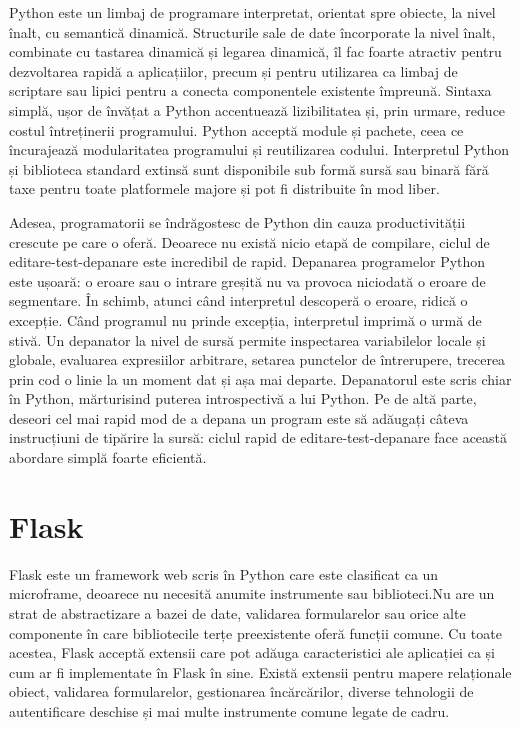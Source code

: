 \par Python este un limbaj de programare interpretat, orientat spre obiecte, la nivel înalt, cu semantică dinamică. Structurile sale de date încorporate la nivel înalt, combinate cu tastarea dinamică și legarea dinamică, îl fac foarte atractiv pentru dezvoltarea rapidă a aplicațiilor, precum și pentru utilizarea ca limbaj de scriptare sau lipici pentru a conecta componentele existente împreună. Sintaxa simplă, ușor de învățat a Python accentuează lizibilitatea și, prin urmare, reduce costul întreținerii programului. Python acceptă module și pachete, ceea ce încurajează modularitatea programului și reutilizarea codului. Interpretul Python și biblioteca standard extinsă sunt disponibile sub formă sursă sau binară fără taxe pentru toate platformele majore și pot fi distribuite în mod liber.
\par Adesea, programatorii se îndrăgostesc de Python din cauza productivității crescute pe care o oferă. Deoarece nu există nicio etapă de compilare, ciclul de editare-test-depanare este incredibil de rapid. Depanarea programelor Python este ușoară: o eroare sau o intrare greșită nu va provoca niciodată o eroare de segmentare. În schimb, atunci când interpretul descoperă o eroare, ridică o excepție. Când programul nu prinde excepția, interpretul imprimă o urmă de stivă. Un depanator la nivel de sursă permite inspectarea variabilelor locale și globale, evaluarea expresiilor arbitrare, setarea punctelor de întrerupere, trecerea prin cod o linie la un moment dat și așa mai departe. Depanatorul este scris chiar în Python, mărturisind puterea introspectivă a lui Python. Pe de altă parte, deseori cel mai rapid mod de a depana un program este să adăugați câteva instrucțiuni de tipărire la sursă: ciclul rapid de editare-test-depanare face această abordare simplă foarte eficientă.

\section{Flask}
\label{sec:ch3sec5}

\par Flask este un framework web scris în Python care este clasificat ca un microframe, deoarece nu necesită anumite instrumente sau biblioteci.Nu are un strat de abstractizare a bazei de date, validarea formularelor sau orice alte componente în care bibliotecile terțe preexistente oferă funcții comune. Cu toate acestea, Flask acceptă extensii care pot adăuga caracteristici ale aplicației ca și cum ar fi implementate în Flask în sine. Există extensii pentru mapere relaționale obiect, validarea formularelor, gestionarea încărcărilor, diverse tehnologii de autentificare deschise și mai multe instrumente comune legate de cadru.
